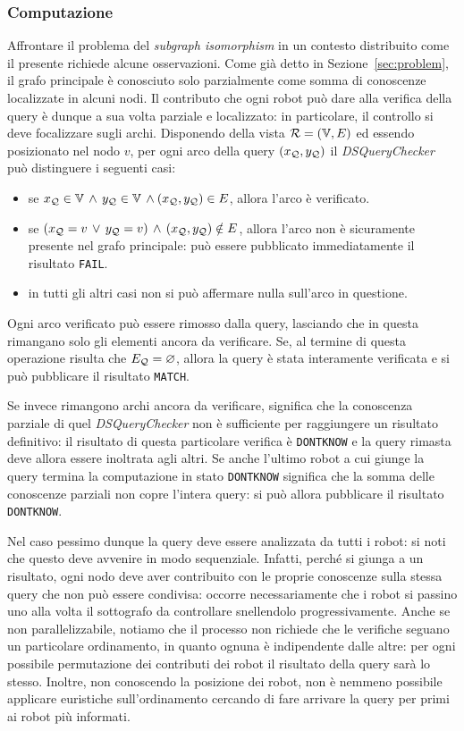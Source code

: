 \subsubsection*{Computazione}
Affrontare il problema del \emph{subgraph isomorphism} in un
contesto distribuito come il presente richiede alcune osservazioni.
Come già detto in Sezione~\ref{sec:problem}, il grafo principale
è conosciuto solo parzialmente come somma di conoscenze localizzate
in alcuni nodi.
Il contributo che ogni robot può dare alla verifica della query
è dunque a sua volta parziale e localizzato: in particolare,
il controllo si deve focalizzare sugli archi.
Disponendo della vista $\mathcal{R} = (\mathbb{V}, E)$ ed essendo posizionato
nel nodo $v$, per ogni arco della query $(x_{\mathcal{Q}}, y_{\mathcal{Q}})$
il \emph{DSQueryChecker} può distinguere i seguenti casi:
\begin{itemize}
\item se \(x_{\mathcal{Q}} \in \mathbb{V}\,\wedge\,y_{\mathcal{Q}} \in \mathbb{V}\,
  \wedge (x_{\mathcal{Q}}, y_{\mathcal{Q}}) \in E\), allora l'arco è verificato.
\item se \((x_{\mathcal{Q}} = v\,\vee\,y_{\mathcal{Q}} = v)\,
  \wedge\,(x_{\mathcal{Q}}, y_{\mathcal{Q}}) \notin E\),
  allora l'arco non è sicuramente presente nel grafo principale:
  può essere pubblicato immediatamente il risultato \texttt{FAIL}.
\item in tutti gli altri casi non si può affermare nulla
  sull'arco in questione.
\end{itemize}
%
Ogni arco verificato può essere rimosso dalla query, lasciando
che in questa rimangano solo gli elementi ancora da verificare.
Se, al termine di questa operazione risulta che $E_{\mathcal{Q}} = \varnothing$,
allora la query è stata interamente verificata e si può
pubblicare il risultato \texttt{MATCH}.

Se invece rimangono archi ancora da verificare, significa che
la conoscenza parziale di quel \emph{DSQueryChecker} non è
sufficiente per raggiungere un risultato definitivo:
il risultato di questa particolare verifica è \texttt{DONTKNOW}
e la query rimasta deve allora essere inoltrata agli altri.
Se anche l'ultimo robot a cui giunge la query termina la
computazione in stato \texttt{DONTKNOW} significa che la somma
delle conoscenze parziali non copre l'intera query: si può
allora pubblicare il risultato \texttt{DONTKNOW}.

Nel caso pessimo dunque la query deve essere analizzata da tutti
i robot: si noti che questo deve avvenire in modo sequenziale.
Infatti, perché si giunga a un risultato, ogni nodo deve aver
contribuito con le proprie conoscenze sulla stessa query che
non può essere condivisa: occorre necessariamente che i robot
si passino uno alla volta il sottografo da controllare
snellendolo progressivamente. Anche se non parallelizzabile,
notiamo che il processo non richiede che le verifiche seguano
un particolare ordinamento, in quanto ognuna è indipendente
dalle altre: per ogni possibile permutazione dei contributi dei
robot il risultato della query sarà lo stesso.
Inoltre, non conoscendo la posizione dei robot, non è nemmeno
possibile applicare euristiche sull'ordinamento cercando
di fare arrivare la query per primi ai robot più informati.

